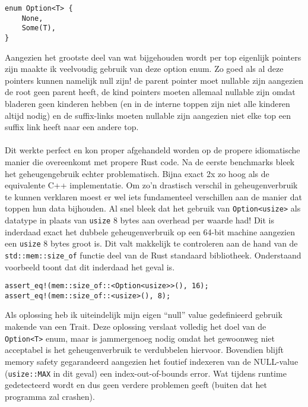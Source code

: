 \begin{verbatim}
enum Option<T> {
    None,
    Some(T),
}
\end{verbatim}

Aangezien het grootste deel van wat bijgehouden wordt per top eigenlijk pointers zijn maakte ik veelvoudig gebruik van deze option enum.
Zo goed als al deze pointers kunnen namelijk null zijn!
de parent pointer moet nullable zijn aangezien de root geen parent heeft, de kind pointers moeten allemaal nullable zijn omdat bladeren geen kinderen hebben (en in de interne toppen zijn niet alle kinderen altijd nodig) en de suffix-links moeten nullable zijn aangezien niet elke top een suffix link heeft naar een andere top.
\\ \\
Dit werkte perfect en kon proper afgehandeld worden op de propere idiomatische manier die overeenkomt met propere Rust code.
Na de eerste benchmarks bleek het geheugengebruik echter problematisch.
Bijna exact 2x zo hoog als de equivalente C++ implementatie.
Om zo'n drastisch verschil in geheugenverbruik te kunnen verklaren moest er wel iets fundamenteel verschillen aan de manier dat toppen hun data bijhouden.
Al snel bleek dat het gebruik van \texttt{Option<usize>} als datatype in plaats van \texttt{usize} 8 bytes aan overhead per waarde had!
Dit is inderdaad exact het dubbele geheugenverbruik op een 64-bit machine aangezien een \texttt{usize} 8 bytes groot is.
Dit valt makkelijk te controleren aan de hand van de \texttt{std::mem::size\_of} functie deel van de Rust standaard bibliotheek.
Onderstaand voorbeeld toont dat dit inderdaad het geval is.
\begin{verbatim}
assert_eq!(mem::size_of::<Option<usize>>(), 16);
assert_eq!(mem::size_of::<usize>(), 8);
\end{verbatim}

Als oplossing heb ik uiteindelijk mijn eigen ``null'' value gedefinieerd gebruik makende van een Trait.
Deze oplossing verslaat volledig het doel van de \texttt{Option<T>} enum, maar is jammergenoeg nodig omdat het gewoonweg niet acceptabel is het geheugenverbruik te verdubbelen hiervoor.
Bovendien blijft memory safety gegarandeerd aangezien het foutief indexeren van de NULL-value (\texttt{usize::MAX} in dit geval) een index-out-of-bounds error.
Wat tijdens runtime gedetecteerd wordt en dus geen verdere problemen geeft (buiten dat het programma zal crashen).

